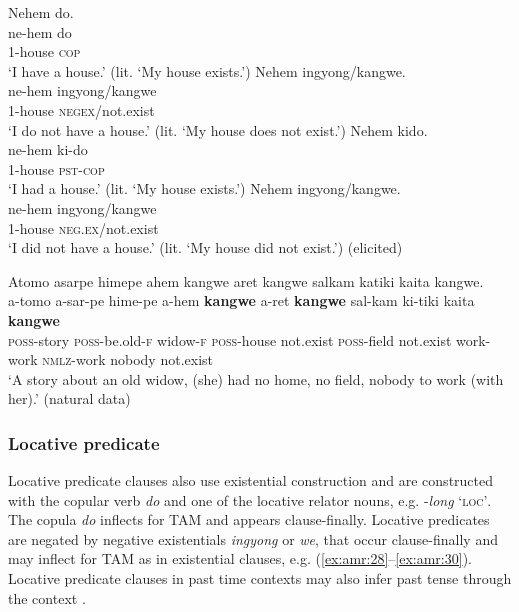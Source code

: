 \documentclass[output=paper,colorlinks,citecolor=brown]{langscibook}
\begin{document}
\ea\label{ex:amr:26}
    \ea\label{ex:amr:26a}Nehem do.  \\ 
        \gll ne-hem do \\
               1-house \textsc{cop} \\
        \glt ‘I have a house.’ (lit. ‘My house exists.') 
    \ex\label{ex:amr:26b}Nehem ingyong/kangwe.  \\
        \gll ne-hem ingyong/kangwe\\
              1-house \textsc{negex}/not.exist \\
        \glt  ‘I do not have a house.’ (lit. ‘My house does not exist.')
    \ex\label{ex:amr:26c}Nehem kido.  \\ 
        \gll ne-hem ki-do \\
              1-house \textsc{pst}{}-\textsc{cop} \\
        \glt  ‘I had a house.’ (lit. ‘My house exists.') 
    \ex\label{ex:amr:26d}Nehem ingyong/kangwe.  \\
        \gll ne-hem ingyong/kangwe\\
              1-house \textsc{neg}.\textsc{ex}/not.exist\\
        \glt ‘I did not have a house.’ (lit. ‘My house did not exist.') (elicited)
    \z
\z 

\newpage
\ea\label{ex:amr:27}Atomo asarpe himepe ahem kangwe aret kangwe salkam katiki kaita kangwe. \\
    \gll a-tomo a-sar-pe hime-pe a-hem \textbf{kangwe} a-ret \textbf{kangwe} sal-kam ki-tiki kaita \textbf{kangwe} \\
         \textsc{poss}{}-story \textsc{poss}{}-be.old-\textsc{f} widow-\textsc{f} \textsc{poss}{}-house not.exist \textsc{poss}{}-field not.exist work-work \textsc{nmlz}{}-work nobody not.exist\\
    \glt ‘A story about an old widow, (she) had no home, no field, nobody to work (with her).’ (natural data)
\z

\subsubsection{Locative predicate}\label{sec:amr:2.3.5}
Locative predicate clauses also use existential construction and are constructed with the copular verb \textit{do} and one of the locative relator nouns, e.g. -\textit{long} ‘\textsc{loc’}. The copula \textit{do} inflects for TAM and appears clause-finally. Locative predicates are negated by negative existentials \textit{ingyong} or \textit{we}, that occur clause-finally and may inflect for TAM as in existential clauses, e.g. (\ref{ex:amr:28}--\ref{ex:amr:30}). Locative predicate clauses in past time contexts may also infer past tense through the context . 
\end{document}
